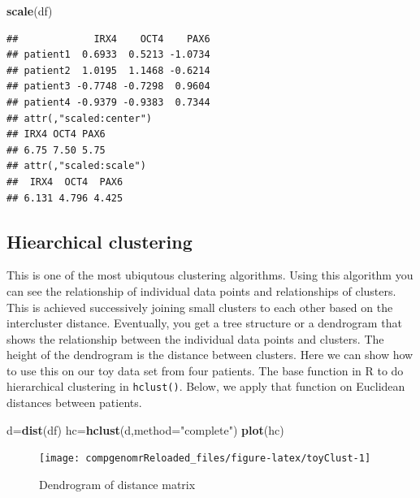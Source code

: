 \documentclass[12pt,]{krantz}
\newenvironment{Shaded}{\begin{snugshade}}{\end{snugshade}}
\newcommand{\DataTypeTok}[1]{\textcolor[rgb]{0.13,0.29,0.53}{#1}}
\newcommand{\KeywordTok}[1]{\textcolor[rgb]{0.13,0.29,0.53}{\textbf{#1}}}
\newcommand{\NormalTok}[1]{#1}
\newcommand{\StringTok}[1]{\textcolor[rgb]{0.31,0.60,0.02}{#1}}
\theoremstyle{definition}
\theoremstyle{definition}
\theoremstyle{definition}
\theoremstyle{remark}
\begin{document}
\begin{Shaded}
\begin{Highlighting}[]
\KeywordTok{scale}\NormalTok{(df)}
\end{Highlighting}
\end{Shaded}

\begin{verbatim}
##             IRX4    OCT4    PAX6
## patient1  0.6933  0.5213 -1.0734
## patient2  1.0195  1.1468 -0.6214
## patient3 -0.7748 -0.7298  0.9604
## patient4 -0.9379 -0.9383  0.7344
## attr(,"scaled:center")
## IRX4 OCT4 PAX6 
## 6.75 7.50 5.75 
## attr(,"scaled:scale")
##  IRX4  OCT4  PAX6 
## 6.131 4.796 4.425
\end{verbatim}

\hypertarget{hiearchical-clustering}{%
\subsection{Hiearchical clustering}\label{hiearchical-clustering}}

This is one of the most ubiqutous clustering algorithms. Using this
algorithm you can see the relationship of individual data points and
relationships of clusters. This is achieved successively joining small
clusters to each other based on the intercluster distance. Eventually,
you get a tree structure or a dendrogram that shows the relationship
between the individual data points and clusters. The height of the
dendrogram is the distance between clusters. Here we can show how to use
this on our toy data set from four patients. The base function in R to
do hierarchical clustering in \texttt{hclust()}. Below, we apply that
function on Euclidean distances between patients.

\begin{Shaded}
\begin{Highlighting}[]
\NormalTok{d=}\KeywordTok{dist}\NormalTok{(df)}
\NormalTok{hc=}\KeywordTok{hclust}\NormalTok{(d,}\DataTypeTok{method=}\StringTok{"complete"}\NormalTok{)}
\KeywordTok{plot}\NormalTok{(hc)}
\end{Highlighting}
\end{Shaded}

\begin{figure}

{\centering \texttt{[image: compgenomrReloaded\_files/figure-latex/toyClust-1]} 

}

\caption{Dendrogram of distance matrix}\label{fig:toyClust}
\end{figure}
\end{document}
